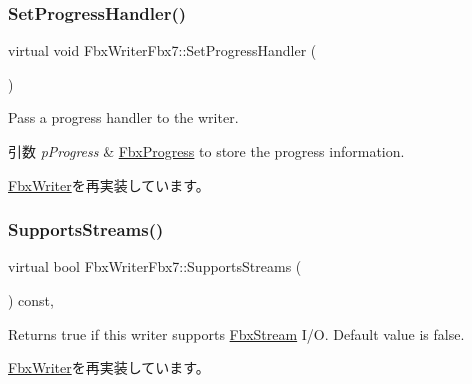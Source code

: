 \mbox{\label{class_fbx_writer_fbx7_a80285d709aabb9d36f3f10d95cebf356}} 
\subsubsection{\texorpdfstring{Set\+Progress\+Handler()}{SetProgressHandler()}}
{\footnotesize\ttfamily virtual void Fbx\+Writer\+Fbx7\+::\+Set\+Progress\+Handler (\begin{DoxyParamCaption}\item[{\hyperlink{class_fbx_progress}{Fbx\+Progress} $\ast$}]{ }\end{DoxyParamCaption})\hspace{0.3cm}{\ttfamily [virtual]}}

Pass a progress handler to the writer. 
\begin{DoxyParams}{引数}
{\em p\+Progress} & \hyperlink{class_fbx_progress}{Fbx\+Progress} to store the progress information. \\
\hline
\end{DoxyParams}


\hyperlink{class_fbx_writer_a1a3cf241a0c11364981ebd23be59fd8f}{Fbx\+Writer}を再実装しています。

\mbox{\label{class_fbx_writer_fbx7_a1db3d07967773f3b1af23d15757c281a}} 
\subsubsection{\texorpdfstring{Supports\+Streams()}{SupportsStreams()}}
{\footnotesize\ttfamily virtual bool Fbx\+Writer\+Fbx7\+::\+Supports\+Streams (\begin{DoxyParamCaption}{ }\end{DoxyParamCaption}) const\hspace{0.3cm}{\ttfamily [inline]}, {\ttfamily [virtual]}}

Returns true if this writer supports \hyperlink{class_fbx_stream}{Fbx\+Stream} I/O. Default value is false. 

\hyperlink{class_fbx_writer_aa79a285227d113ee6d64aee6a84986cd}{Fbx\+Writer}を再実装しています。



